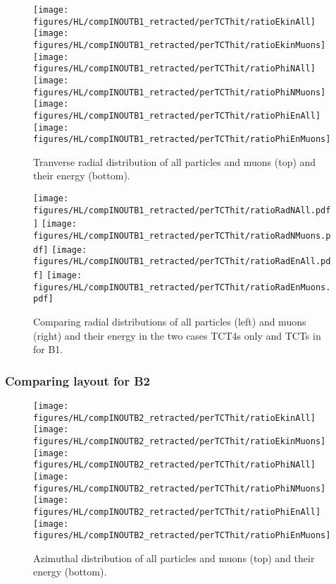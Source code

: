 \begin{figure}
\centering
\texttt{[image: figures/HL/compINOUTB1\_retracted/perTCThit/ratioEkinAll]}
\texttt{[image: figures/HL/compINOUTB1\_retracted/perTCThit/ratioEkinMuons]}
\texttt{[image: figures/HL/compINOUTB1\_retracted/perTCThit/ratioPhiNAll]}
\texttt{[image: figures/HL/compINOUTB1\_retracted/perTCThit/ratioPhiNMuons]}
\texttt{[image: figures/HL/compINOUTB1\_retracted/perTCThit/ratioPhiEnAll]}
\texttt{[image: figures/HL/compINOUTB1\_retracted/perTCThit/ratioPhiEnMuons]}

 \caption{Tranverse radial distribution of all particles and muons (top) and their energy (bottom).
  \label{fig:compInOutB1}}
\end{figure}

\begin{figure}
\centering
\texttt{[image: figures/HL/compINOUTB1\_retracted/perTCThit/ratioRadNAll.pdf]}
\texttt{[image: figures/HL/compINOUTB1\_retracted/perTCThit/ratioRadNMuons.pdf]}
\texttt{[image: figures/HL/compINOUTB1\_retracted/perTCThit/ratioRadEnAll.pdf]}
\texttt{[image: figures/HL/compINOUTB1\_retracted/perTCThit/ratioRadEnMuons.pdf]}
 \caption{Comparing radial distributions of all particles (left) and muons (right) and their energy in the two cases TCT4s only and TCTs in for B1.
  \label{compINOUTB1}}
\end{figure}


\subsubsection{Comparing layout for B2}


\begin{figure}
\begin{center}
\texttt{[image: figures/HL/compINOUTB2\_retracted/perTCThit/ratioEkinAll]}
\texttt{[image: figures/HL/compINOUTB2\_retracted/perTCThit/ratioEkinMuons]}
\texttt{[image: figures/HL/compINOUTB2\_retracted/perTCThit/ratioPhiNAll]}
\texttt{[image: figures/HL/compINOUTB2\_retracted/perTCThit/ratioPhiNMuons]}
\texttt{[image: figures/HL/compINOUTB2\_retracted/perTCThit/ratioPhiEnAll]}
\texttt{[image: figures/HL/compINOUTB2\_retracted/perTCThit/ratioPhiEnMuons]}
\end{center}
\vspace{-0.6cm}
 \caption{Azimuthal distribution of all particles and muons (top) and their energy (bottom).
  \label{fig:compInOutB2}}
\end{figure}

